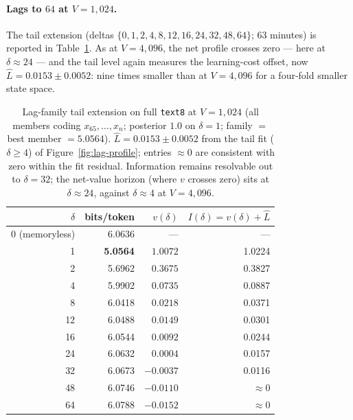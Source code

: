 \documentclass[11pt]{article}
\begin{document}
\paragraph{Lags to $64$ at $V=1{,}024$.}
The tail extension (deltas
$\{0,1,2,4,8,12,16,24,32,48,64\}$; $63$ minutes) is reported in
Table~\ref{tab:lag-family-tail}.  As at $V=4{,}096$, the net profile
crosses zero --- here at $\delta \approx 24$ --- and the tail level
again measures the learning-cost offset, now
$\hat L = 0.0153 \pm 0.0052$: nine times smaller than at
$V=4{,}096$ for a four-fold smaller state space.

\begin{table}[ht]
\centering
\begin{tabular}{rrrr}
\toprule
$\delta$ & bits/token & $v(\delta)$ & $I(\delta) = v(\delta)+\hat L$ \\
\midrule
0 (memoryless) & 6.0636 & --- & --- \\
1  & \textbf{5.0564} & $1.0072$ & 1.0224 \\
2  & 5.6962 & $0.3675$ & 0.3827 \\
4  & 5.9902 & $0.0735$ & 0.0887 \\
8  & 6.0418 & $0.0218$ & 0.0371 \\
12 & 6.0488 & $0.0149$ & 0.0301 \\
16 & 6.0544 & $0.0092$ & 0.0244 \\
24 & 6.0632 & $0.0004$ & 0.0157 \\
32 & 6.0673 & $-0.0037$ & 0.0116 \\
48 & 6.0746 & $-0.0110$ & $\approx 0$ \\
64 & 6.0788 & $-0.0152$ & $\approx 0$ \\
\bottomrule
\end{tabular}
\caption{Lag-family tail extension on full \texttt{text8} at
  $V=1{,}024$ (all members coding $x_{65},\dots,x_n$; posterior $1.0$
  on $\delta = 1$; family $=$ best member $= 5.0564$).
  $\hat L = 0.0153 \pm 0.0052$ from the tail fit ($\delta \ge 4$) of
  Figure~\ref{fig:lag-profile}; entries $\approx 0$ are consistent
  with zero within the fit residual.  Information remains resolvable
  out to $\delta = 32$; the net-value horizon (where $v$ crosses
  zero) sits at $\delta \approx 24$, against $\delta \approx 4$ at
  $V=4{,}096$.}
\label{tab:lag-family-tail}
\end{table}
\end{document}
